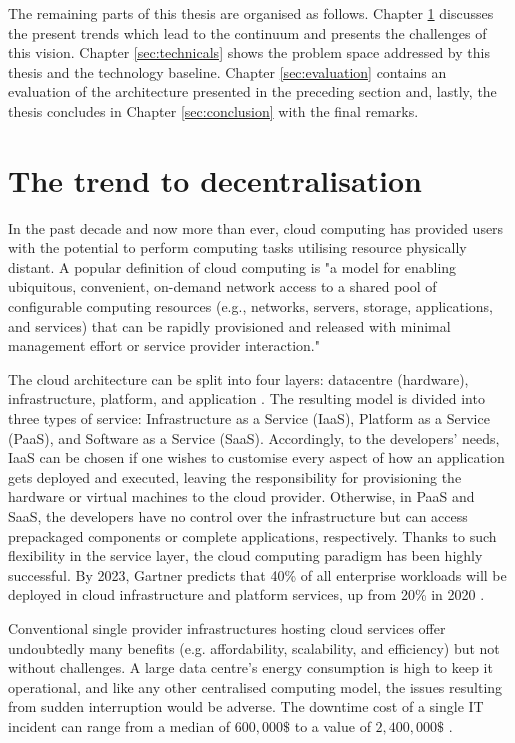 The remaining parts of this thesis are organised as follows. Chapter \ref{sec:challenges} discusses the present trends which lead to the continuum and presents the challenges of this vision. Chapter \ref{sec:technicals} shows the problem space addressed by this thesis and the technology baseline. Chapter \ref{sec:evaluation} contains an evaluation of the architecture presented in the preceding section and, lastly, the thesis concludes in Chapter \ref{sec:conclusion} with the final remarks.

\section{The trend to decentralisation}
\label{sec:challenges}

In the past decade and now more than ever, cloud computing has provided users with the potential to perform computing tasks utilising resource physically distant. A popular definition of cloud computing \cite{mell2011nist} is "a model for enabling ubiquitous, convenient, on-demand network access to a shared pool of configurable computing resources (e.g., networks, servers, storage, applications, and services) that can be rapidly provisioned and released with minimal management effort or service provider interaction."

The cloud architecture can be split into four layers: datacentre (hardware), infrastructure, platform, and application \cite{zhang2010cloud}. The resulting model is divided into three types of service: Infrastructure as a Service (IaaS), Platform as a Service (PaaS), and Software as a Service (SaaS). Accordingly, to the developers' needs, IaaS can be chosen if one wishes to customise every aspect of how an application gets deployed and executed, leaving the responsibility for provisioning the hardware or virtual machines to the cloud provider. Otherwise, in PaaS and SaaS, the developers have no control over the infrastructure but can access prepackaged components or complete applications, respectively. Thanks to such flexibility in the service layer, the cloud computing paradigm has been highly successful. By 2023, Gartner predicts that 40\% of all enterprise workloads will be deployed in cloud infrastructure and platform services, up from 20\% in 2020 \cite{gartner-cloud-edge}.

Conventional single provider infrastructures hosting cloud services offer undoubtedly many benefits (e.g. affordability, scalability, and efficiency) but not without challenges. A large data centre's energy consumption is high to keep it operational, and like any other centralised computing model, the issues resulting from sudden interruption would be adverse. The downtime cost of a single IT incident can range from a median of $600,000\$$ to a value of $2,400,000\$$ \cite{downtime-cost}.

